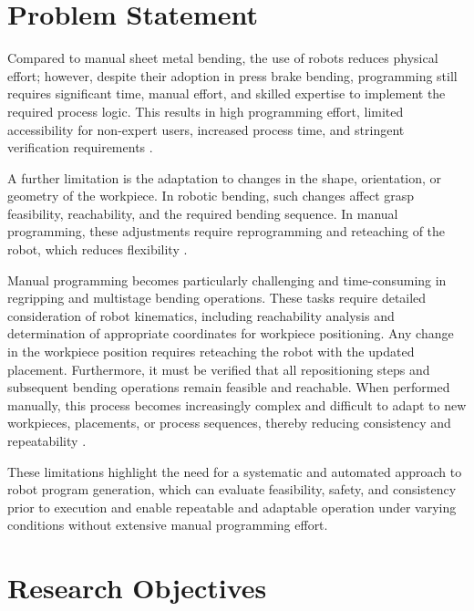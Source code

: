 \section{Problem Statement}
\label{sec:introduction-problem-statement}

Compared to manual sheet metal bending, the use of robots reduces physical effort; however, despite their adoption in press brake bending, programming still requires significant time, manual effort, and skilled expertise to implement the required process logic. This results in high programming effort, limited accessibility for non-expert users, increased process time, and stringent verification requirements \cite{Pan2012Survey,Neto2013OLP}.

A further limitation is the adaptation to changes in the shape, orientation, or geometry of the workpiece. In robotic bending, such changes affect grasp feasibility, reachability, and the required bending sequence. In manual programming, these adjustments require reprogramming and reteaching of the robot, which reduces flexibility \cite{Gupta1998SheetMetalBending,Aomura2002RoboticBending}.

Manual programming becomes particularly challenging and time-consuming in regripping and multistage bending operations. These tasks require detailed consideration of robot kinematics, including reachability analysis and determination of appropriate coordinates for workpiece positioning. Any change in the workpiece position requires reteaching the robot with the updated placement. Furthermore, it must be verified that all repositioning steps and subsequent bending operations remain feasible and reachable. When performed manually, this process becomes increasingly complex and difficult to adapt to new workpieces, placements, or process sequences, thereby reducing consistency and repeatability \cite{Aomura2002RoboticBending,Gupta1998SheetMetalBending}.

These limitations highlight the need for a systematic and automated approach to robot program generation, which can evaluate feasibility, safety, and consistency prior to execution and enable repeatable and adaptable operation under varying conditions without extensive manual programming effort.


\section{Research Objectives}
\label{sec:introduction-research-objectives}

